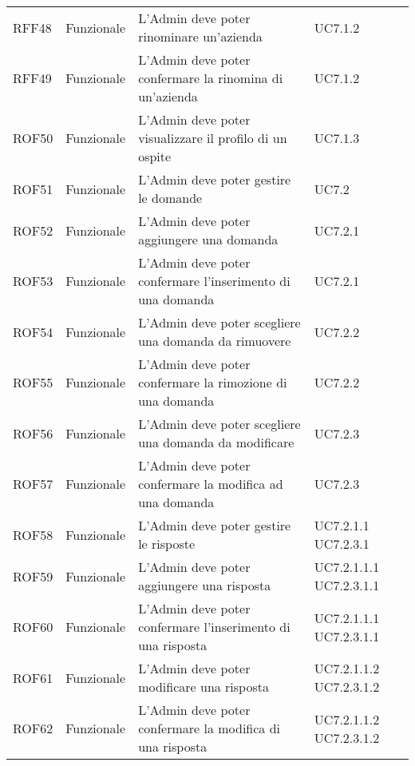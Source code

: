 \documentclass[../AnalisiDeiRequisiti_v4.0.0.tex]{subfiles}
\begin{document}
\begin{longtable}{p{2.5cm}!{\VRule[1pt]}p{2.5cm}!{\VRule[1pt]}p{5cm}!{\VRule[1pt]}p{2.5cm}}
	RFF48&Funzionale\newline  & L'Admin deve poter rinominare un'azienda & UC7.1.2 \\
	RFF49&Funzionale\newline  & L'Admin deve poter confermare la rinomina di un'azienda & UC7.1.2 \\
	ROF50&Funzionale\newline  & L'Admin deve poter visualizzare il profilo di un ospite & UC7.1.3 \\
	ROF51&Funzionale\newline  & L'Admin deve poter gestire le domande & UC7.2 \\
	ROF52&Funzionale\newline  & L'Admin deve poter aggiungere una domanda & UC7.2.1 \\
	ROF53&Funzionale\newline  & L'Admin deve poter confermare l'inserimento di una domanda & UC7.2.1 \\
	ROF54&Funzionale\newline  & L'Admin deve poter scegliere una domanda da rimuovere & UC7.2.2 \\
	ROF55&Funzionale\newline  & L'Admin deve poter confermare la rimozione di una domanda & UC7.2.2 \\
	ROF56&Funzionale\newline  & L'Admin deve poter scegliere una domanda da modificare & UC7.2.3 \\
	ROF57&Funzionale\newline  & L'Admin deve poter confermare la modifica ad una domanda & UC7.2.3 \\
	ROF58&Funzionale\newline  & L'Admin deve poter gestire le risposte & UC7.2.1.1 UC7.2.3.1 \\
	ROF59&Funzionale\newline  & L'Admin deve poter aggiungere una risposta & UC7.2.1.1.1 UC7.2.3.1.1 \\
	ROF60&Funzionale\newline  & L'Admin deve poter confermare l'inserimento di una risposta & UC7.2.1.1.1 UC7.2.3.1.1 \\
	ROF61&Funzionale\newline  & L'Admin deve poter modificare una risposta & UC7.2.1.1.2 UC7.2.3.1.2 \\
	ROF62&Funzionale\newline  & L'Admin deve poter confermare la modifica di una risposta & UC7.2.1.1.2 UC7.2.3.1.2 \\

\end{longtable}
\end{document}
